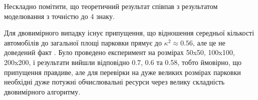 Нескладно помітити, що теоретичний результат співпав з результатом моделювання з точністю до 4 знаку.

Для двовимірного випадку існує припущення, що відношення середньої кількості автомобілів до загальної площі парковки прямує до $\kappa^2 \approx 0.56$, але це не доведений факт \cite{MathWorldRenyi}. Було проведено експеримент на розмірах 50x50, 100x100, 200x200, і результати вийшли відповідно 0.7, 0.6 та 0.58, тобто ймовірно, що припущення правдиве, але для перевірки на дуже великих розмірах парковки необхідні дуже потужні обчислювальні ресурси через велику складність двовимірного алгоритму.